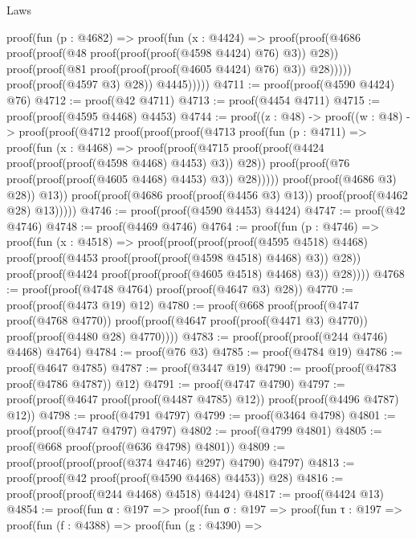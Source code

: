 \begin{lexlean}{Laws}
\begin{coremodule}
                      proof(fun (p : @4682) =>
                        proof(fun (x : @4424) =>
                          proof(proof(@4686
                                proof(proof(@48 proof(proof(proof(@4598 @4424) @76) @3)) @28))
                              proof(proof(@81 proof(proof(proof(@4605 @4424) @76) @3)) @28)))))
                    proof(proof(@4597 @3) @28))
                  @4445)))))
@4711 := proof(proof(@4590 @4424) @76)
@4712 := proof(@42 @4711)
@4713 := proof(@4454 @4711)
@4715 := proof(proof(@4595 @4468) @4453)
@4744 := proof((z : @48) ->
    proof((w : @48) ->
      proof(proof(@4712
            proof(proof(proof(@4713
                    proof(fun (p : @4711) =>
                      proof(fun (x : @4468) =>
                        proof(proof(@4715
                              proof(proof(@4424 proof(proof(proof(@4598 @4468) @4453) @3)) @28))
                            proof(proof(@76 proof(proof(proof(@4605 @4468) @4453) @3)) @28)))))
                  proof(proof(@4686 @3) @28))
                @13))
          proof(proof(@4686 proof(proof(@4456 @3) @13)) proof(proof(@4462 @28) @13)))))
@4746 := proof(proof(@4590 @4453) @4424)
@4747 := proof(@42 @4746)
@4748 := proof(@4469 @4746)
@4764 := proof(fun (p : @4746) =>
    proof(fun (x : @4518) =>
      proof(proof(proof(proof(@4595 @4518) @4468)
            proof(proof(@4453 proof(proof(proof(@4598 @4518) @4468) @3)) @28))
          proof(proof(@4424 proof(proof(proof(@4605 @4518) @4468) @3)) @28))))
@4768 := proof(proof(@4748 @4764) proof(proof(@4647 @3) @28))
@4770 := proof(proof(@4473 @19) @12)
@4780 := proof(@668
      proof(proof(@4747 proof(@4768 @4770))
          proof(proof(@4647 proof(proof(@4471 @3) @4770)) proof(proof(@4480 @28) @4770))))
@4783 := proof(proof(proof(@244 @4746) @4468) @4764)
@4784 := proof(@76 @3)
@4785 := proof(@4784 @19)
@4786 := proof(@4647 @4785)
@4787 := proof(@3447 @19)
@4790 := proof(proof(@4783 proof(@4786 @4787)) @12)
@4791 := proof(@4747 @4790)
@4797 := proof(proof(@4647 proof(proof(@4487 @4785) @12)) proof(proof(@4496 @4787) @12))
@4798 := proof(@4791 @4797)
@4799 := proof(@3464 @4798)
@4801 := proof(proof(@4747 @4797) @4797)
@4802 := proof(@4799 @4801)
@4805 := proof(@668 proof(proof(@636 @4798) @4801))
@4809 := proof(proof(proof(proof(@374 @4746) @297) @4790) @4797)
@4813 := proof(proof(@42 proof(proof(@4590 @4468) @4453)) @28)
@4816 := proof(proof(proof(@244 @4468) @4518) @4424)
@4817 := proof(@4424 @13)
@4854 := proof(fun {α : @197} =>
    proof(fun {σ : @197} =>
      proof(fun {τ : @197} =>
        proof(fun (f : @4388) =>
          proof(fun (g : @4390) =>

\end{coremodule}
\end{lexlean}
